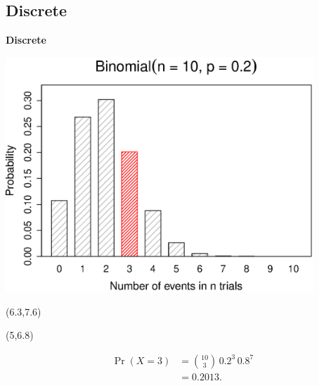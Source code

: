 \documentclass[compress]{beamer}        %
\makeatletter
\newcommand{\tcb}{\textcolor{beamer@blendedblue}}
\makeatother
\begin{document}
\subsection{Discrete}
\begin{frame}{\bf \tcb{Discrete}\\[-1.1cm]}
\begin{center}
\includegraphics[width=0.87\textwidth, trim = 0.0cm 0.5cm 0.3cm 0.5cm, clip]{Binomial}
\end{center}
\begin{textblock}{1}(6.3,7.6)
\xymatrixcolsep{0.8cm}
\end{textblock}
\begin{textblock}{10}(5,6.8)
\begin{scriptsize}
\begin{align*}
\Pr(X=3) &= \binom{10}{3} \, 0.2^3 \, 0.8^{7}\\
&= 0.2013.
\end{align*}
\end{scriptsize}
\end{textblock}
\end{frame}
\end{document}
